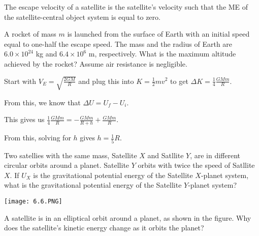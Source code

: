 \documentclass[../mech.tex]{subfiles}
\begin{document}
The escape velocity of a satellite is the satellite's velocity such that the ME of the satellite-central object system is equal to zero.

\begin{example}
    A rocket of mass $m$ is launched from the surface of Earth with an initial speed equal to one-half the escape speed. The mass and the radius of Earth are $6.0\times 10^{24}$ kg and $6.4\times 10^6$ m, respectively. What is the maximum altitude achieved by the rocket? Assume air resistance is negligible.

    Start with $V_E = \sqrt{\frac{2GM}{R}}$ and plug this into $K=\frac{1}{2}mv^2$ to get $\Delta K = \frac{1}{4}\frac{GMm}R$.

    From this, we know that $\Delta U = U_f-U_i$.

    This gives us $\frac{1}{4}\frac{GMm}{R}=-\frac{GMm}{R+h}+\frac{GMm}{R}$.

    From this, solving for $h$ gives $h=\frac{1}{5}R$.
\end{example}

\ex Two satellies with the same mass, Satellite $X$ and Satllite $Y$, are in different circular orbits around a planet. Satellite $Y$ orbits with twice the speed of Satllite $X$. If $U_X$ is the gravitational potential energy of the Satellite $X$-planet system, what is the gravitational potential energy of the Satellite $Y$-planet system?

\pagebreak
\ex \begin{center}
    \texttt{[image: 6.6.PNG]}
\end{center}
A satellite is in an elliptical orbit around a planet, as shown in the figure. Why does the satellite's kinetic energy change as it orbits the planet?
\end{document}
